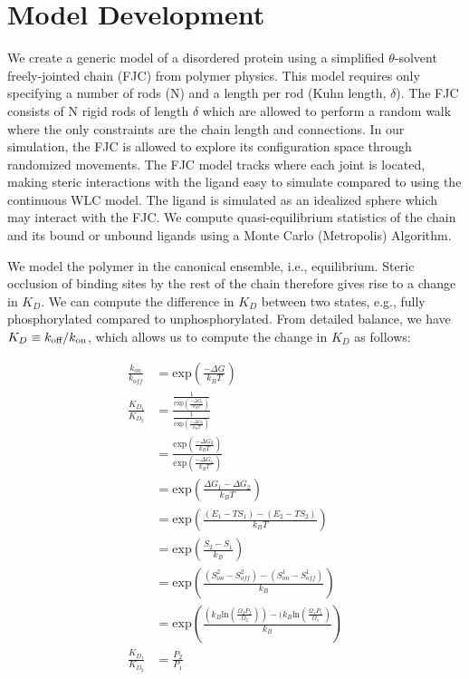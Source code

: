 \documentclass[../AdvancementSummary.tex]{subfiles}
\begin{document}
\section{Model Development}
\label{sec:ModelDev}

We create a generic model of a disordered protein using a simplified $\theta$-solvent freely-jointed chain (FJC) from polymer physics. This model requires only specifying a number of rods (N) and a length per rod (Kuhn length, $\delta$). The FJC consists of N rigid rods of length $\delta$ which are allowed to perform a random walk where the only constraints are the chain length and connections. In our simulation, the FJC is allowed to explore its configuration space through randomized movements. The FJC model tracks where each joint is located, making steric interactions with the ligand easy to simulate compared to using the continuous WLC model. The ligand is simulated as an idealized sphere which may interact with the FJC. We compute quasi-equilibrium statistics of the chain and its bound or unbound ligands using a Monte Carlo (Metropolis) Algorithm. 

We model the polymer in the canonical ensemble, i.e., equilibrium. Steric occlusion of binding sites by the rest of the chain therefore gives rise to a change in $K_D$. We can compute the difference in $K_D$ between two states, e.g., fully phosphorylated compared to unphosphorylated. From detailed balance, we have $K_D \equiv k_{\mbox{\scriptsize off}}/k_{\mbox{\scriptsize on}}$, which allows us to compute the change in $K_D$ as follows: 

\begin{align} 
\frac{k_{on}}{k_{off}} &= \mbox{exp} \left( \frac{-\Delta G}{k_B T}\right) \\
\frac{K_{D_1}}{K_{D_2}} &= \frac{\frac{1}{\mbox{exp} \left( \frac{-\Delta G_1}{k_B T}\right) }}{\frac{1}{\mbox{exp} \left( \frac{-\Delta G_2}{k_B T}\right)}} \\ 
&= \frac{\mbox{exp} \left( \frac{-\Delta G_2}{k_B T} \right)}{\mbox{exp} \left( \frac{-\Delta G_1}{k_B T} \right)} \\
&= \mbox{exp} \left(\frac{\Delta G_1-\Delta G_2}{k_B T}\right) \\
&= \mbox{exp} \left( \frac{(E_1-T S_1)-(E_2-T S_2)}{k_B T} \right) \\
&= \mbox{exp} \left(\frac{S_2-S_1}{k_B}\right) \\
&= \mbox{exp}\left(\frac{(S^2_{on}-S^2_{off}) - (S^1_{on}-S^1_{off})}{k_B} \right) \\
&= \mbox{exp} \left( \frac{(k_B \mbox{ln} (\frac{\Omega_2 P_2}{\Omega_2}))-(k_B \mbox{ln}(\frac{\Omega_1 P_1}{\Omega_1})}{k_B} \right) \\
\frac{K_{D_1}}{K_{D_2}} &= \frac{P_2}{P_1}\\
\end{align}  
\end{document}
